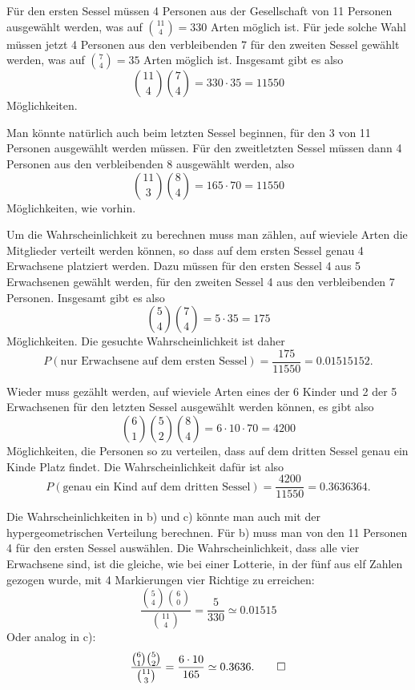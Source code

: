 \begin{loesung}
\begin{teilaufgaben}
\item Für den ersten Sessel müssen 4 Personen aus der Gesellschaft
von 11 Personen ausgewählt werden, was auf $\binom{11}{4}=330$
Arten möglich ist. Für jede solche Wahl müssen jetzt 4 Personen
aus den verbleibenden 7 für den zweiten Sessel gewählt werden,
was auf $\binom{7}{4}=35$ Arten möglich ist. Insgesamt gibt es
also 
\[
\binom{11}{4}\binom{7}{4}=330\cdot 35=11550
\]
Möglichkeiten.

Man könnte natürlich auch beim letzten Sessel beginnen, für
den 3 von 11 Personen ausgewählt werden müssen. Für den 
zweitletzten Sessel müssen dann 4 Personen aus den verbleibenden
8 ausgewählt werden, also 
\[
\binom{11}{3}\binom{8}{4}=165\cdot 70=11550
\]
Möglichkeiten, wie vorhin.
\item
Um die Wahrscheinlichkeit zu berechnen muss man zählen, auf
wieviele Arten die Mitglieder verteilt werden können, so dass
auf dem ersten Sessel genau 4 Erwachsene platziert werden.
Dazu müssen für den ersten Sessel 4 aus 5 Erwachsenen gewählt werden,
für den zweiten Sessel 4 aus den verbleibenden 7 Personen. Insgesamt
gibt es also
\[
\binom{5}{4}\binom{7}{4}=5\cdot 35=175
\]
Möglichkeiten. Die gesuchte Wahrscheinlichkeit ist daher
\[
P(\text{nur Erwachsene auf dem ersten Sessel})=
\frac{175}{11550}=0.01515152.
\]
\item
Wieder muss gezählt werden, auf wieviele Arten eines der 6 Kinder
und 2 der 5 Erwachsenen 
für
den letzten Sessel ausgewählt werden können, es gibt also
\[
\binom{6}{1}\binom{5}{2}\binom{8}{4}=6\cdot 10\cdot70=4200
\]
Möglichkeiten, die Personen so zu verteilen, dass auf dem dritten
Sessel genau ein Kinde Platz findet. Die Wahrscheinlichkeit dafür ist
also
\[
P(\text{genau ein Kind auf dem dritten Sessel})=\frac{4200}{11550}=0.3636364.
\]
\end{teilaufgaben}
Die Wahrscheinlichkeiten in b) und c) könnte man auch mit der
hypergeometrischen Verteilung berechnen. Für b) muss man von
den 11 Personen 4 für den ersten Sessel auswählen.
Die Wahrscheinlichkeit,
dass alle vier Erwachsene sind, ist
die gleiche, wie bei einer Lotterie, in der fünf aus elf Zahlen gezogen wurde,
mit 4 Markierungen vier Richtige zu erreichen:
\[
\frac{
\binom{5}{4}\binom{6}{0}
}{
\binom{11}{4}
}
=\frac{5}{330}\simeq 0.01515
\]
Oder analog in c):
\[
\frac{
\binom{6}{1}\binom{5}{2}
}{
\binom{11}{3}
}
=\frac{6\cdot 10}{165}\simeq 0.3636.
\qedhere
\]
\end{loesung}
